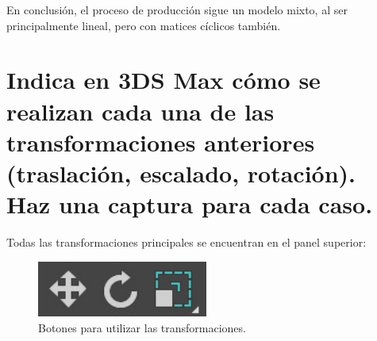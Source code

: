 \documentclass{article}
\begin{document}
\bigskip

En conclusión, el proceso de producción sigue un modelo mixto, al ser principalmente lineal, pero con matices cíclicos también.

\section{Indica en 3DS Max cómo se realizan cada una de las transformaciones anteriores (traslación, escalado, rotación). Haz una captura para cada caso.}

Todas las transformaciones principales se encuentran en el panel superior:

\begin{figure}[H]
    \centering
    \includegraphics[width=0.5\textwidth]{imagenes/tools.jpg}
    \caption{Botones para utilizar las transformaciones.}
 \end{figure}
\end{document}
